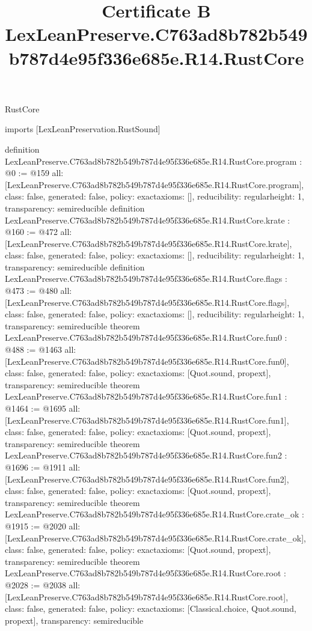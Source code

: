 \begin{lexlean}{RustCore}
\title{Certificate B LexLeanPreserve.C763ad8b782b549b787d4e95f336e685e.R14.RustCore}
\begin{coremodule}
imports [LexLeanPreservation.RustSound]

definition LexLeanPreserve.C763ad8b782b549b787d4e95f336e685e.R14.RustCore.program : @0 := @159 {
  all: [LexLeanPreserve.C763ad8b782b549b787d4e95f336e685e.R14.RustCore.program],
  class: false,
  generated: false,
  policy: exact{axioms: []},
  reducibility: regular{height: 1},
  transparency: semireducible
}
definition LexLeanPreserve.C763ad8b782b549b787d4e95f336e685e.R14.RustCore.krate : @160 := @472 {
  all: [LexLeanPreserve.C763ad8b782b549b787d4e95f336e685e.R14.RustCore.krate],
  class: false,
  generated: false,
  policy: exact{axioms: []},
  reducibility: regular{height: 1},
  transparency: semireducible
}
definition LexLeanPreserve.C763ad8b782b549b787d4e95f336e685e.R14.RustCore.flags : @473 := @480 {
  all: [LexLeanPreserve.C763ad8b782b549b787d4e95f336e685e.R14.RustCore.flags],
  class: false,
  generated: false,
  policy: exact{axioms: []},
  reducibility: regular{height: 1},
  transparency: semireducible
}
theorem LexLeanPreserve.C763ad8b782b549b787d4e95f336e685e.R14.RustCore.fun0 : @488 := @1463 {
  all: [LexLeanPreserve.C763ad8b782b549b787d4e95f336e685e.R14.RustCore.fun0],
  class: false,
  generated: false,
  policy: exact{axioms: [Quot.sound, propext]},
  transparency: semireducible
}
theorem LexLeanPreserve.C763ad8b782b549b787d4e95f336e685e.R14.RustCore.fun1 : @1464 := @1695 {
  all: [LexLeanPreserve.C763ad8b782b549b787d4e95f336e685e.R14.RustCore.fun1],
  class: false,
  generated: false,
  policy: exact{axioms: [Quot.sound, propext]},
  transparency: semireducible
}
theorem LexLeanPreserve.C763ad8b782b549b787d4e95f336e685e.R14.RustCore.fun2 : @1696 := @1911 {
  all: [LexLeanPreserve.C763ad8b782b549b787d4e95f336e685e.R14.RustCore.fun2],
  class: false,
  generated: false,
  policy: exact{axioms: [Quot.sound, propext]},
  transparency: semireducible
}
theorem LexLeanPreserve.C763ad8b782b549b787d4e95f336e685e.R14.RustCore.crate_ok : @1915 := @2020 {
  all: [LexLeanPreserve.C763ad8b782b549b787d4e95f336e685e.R14.RustCore.crate_ok],
  class: false,
  generated: false,
  policy: exact{axioms: [Quot.sound, propext]},
  transparency: semireducible
}
theorem LexLeanPreserve.C763ad8b782b549b787d4e95f336e685e.R14.RustCore.root : @2028 := @2038 {
  all: [LexLeanPreserve.C763ad8b782b549b787d4e95f336e685e.R14.RustCore.root],
  class: false,
  generated: false,
  policy: exact{axioms: [Classical.choice, Quot.sound, propext]},
  transparency: semireducible
}


\end{coremodule}
\end{lexlean}

